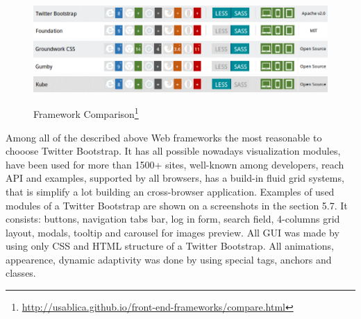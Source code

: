 	\begin{figure}[!ht]
	\centering
	\includegraphics[scale=0.7]{images/Bootstrap&Foundation.png}
	\includegraphics[scale=0.7]{images/Groundwork&Gumby.png} 
	\includegraphics[scale=0.7]{images/Kube.png}  
	\caption[Framework Comparison]{Framework Comparison\footnote{\url{http://usablica.github.io/front-end-frameworks/compare.html}}}
	\label{img:Bootstrap&Foundation.png}
	\label{img:Groundwork&Gumby.png}   
	\label{img:Kube.png}                          
	\end{figure}

 Among all of the described above Web frameworks the most reasonable to chooose Twitter Bootstrap. It has all possible nowadays visualization modules, have been used for more than 1500+ sites, well-known among developers, reach API and examples, supported by all browsers, has a build-in fluid grid systems, that is simplify a lot building an cross-browser application.
 \newline
 Examples of used modules of a Twitter Bootstrap are shown on a screenshots in the section 5.7. It consists: buttons, navigation tabs bar, log in form, search field, 4-columns grid layout, modals, tooltip and carousel for images preview. All GUI was made by using only CSS and HTML structure of a Twitter Bootstrap. All animations, appearence, dynamic adaptivity was done by using special tags, anchors and classes. 

